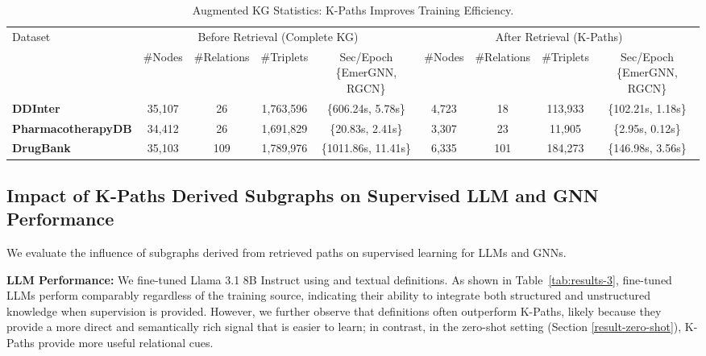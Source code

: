 \begin{table*}[t]
    \centering
    \begin{adjustbox}{max width=0.9\textwidth}
    \begin{tabular}{lcccccccc}
        \toprule
        \multirow{2}{*}{Dataset} & \multicolumn{4}{c}{Before Retrieval (Complete KG)} & \multicolumn{4}{c}{After Retrieval (K-Paths)} \\
        \cmidrule(lr){2-5} \cmidrule(lr){6-9}
         & \#Nodes & \#Relations & \#Triplets & Sec/Epoch \{EmerGNN, RGCN\} & \#Nodes & \#Relations & \#Triplets & Sec/Epoch \{EmerGNN, RGCN\} \\
        \midrule
        \textbf{DDInter}  & 35,107 & 26 & 1,763,596 & \{606.24s, 5.78s\} & 4,723 & 18 & 113,933 & \{102.21s, 1.18s\} \\
        \textbf{PharmacotherapyDB} & 34,412 & 26 & 1,691,829 & \{20.83s, 2.41s\} & 3,307 & 23 & 11,905 & \{2.95s, 0.12s\} \\
        \textbf{DrugBank} & 35,103 & 109 & 1,789,976 & \{1011.86s, 11.41s\} & 6,335 & 101 & 184,273 & \{146.98s, 3.56s\} \\
        \bottomrule
    \end{tabular}
    \end{adjustbox}
        \caption{Augmented KG Statistics: K-Paths Improves Training Efficiency.}
        \label{results-efficiency}
\end{table*}

\subsection{Impact of K-Paths Derived Subgraphs on Supervised LLM and GNN Performance}
We evaluate the influence of subgraphs derived from retrieved paths on supervised learning for LLMs and GNNs.

\textbf{LLM Performance:} We fine-tuned Llama 3.1 8B Instruct using \sys and textual definitions.
As shown in Table~\ref{tab:results-3}, fine-tuned LLMs perform comparably regardless of the training source, indicating their ability to integrate both structured and unstructured knowledge when supervision is provided.
However, we further observe that definitions often outperform K-Paths, likely because they provide a more direct and semantically rich signal that is easier to learn; in contrast, in the zero-shot setting (Section \ref{result-zero-shot}), K-Paths provide more useful relational cues.


